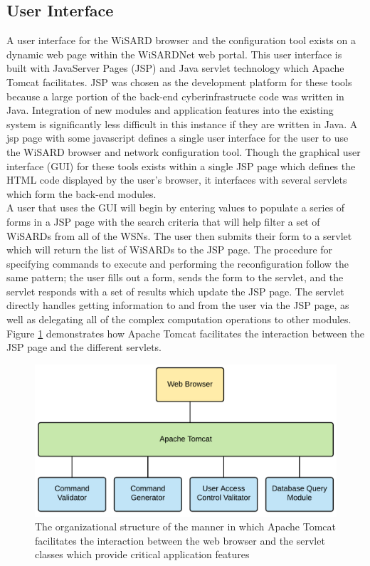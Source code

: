 \subsection{User Interface}
A user interface for the WiSARD browser and the configuration tool exists on a dynamic web page within the WiSARDNet web portal. This user interface is built with JavaServer Pages (JSP) and Java servlet technology which Apache Tomcat facilitates. JSP was chosen as the development platform for these tools because a large portion of the back-end cyberinfrastructe code was written in Java. Integration of new modules and application features into the existing system is significantly less difficult in this instance if they are written in Java. A jsp page with some javascript defines a single user interface for the user to use the WiSARD browser and network configuration tool.  Though the graphical user interface (GUI) for these tools exists within a single JSP page which defines the HTML code displayed by the user's browser, it interfaces with several servlets which form the back-end modules.\\

A user that uses the GUI will begin by entering values to populate a series of forms in a JSP page with the search criteria that will help filter a set of WiSARDs from all of the WSNs. The user then submits their form to a servlet which will return the list  of WiSARDs to the JSP page. The procedure for specifying commands to execute and performing the reconfiguration follow the same pattern; the user fills out a form, sends the form to the servlet, and the servlet responds with a set of results which update the JSP page. The servlet directly handles getting information to and from the user via the JSP page, as well as delegating all of the complex computation operations to other modules. Figure \ref{fig:servlet_architecture} demonstrates how Apache Tomcat facilitates the interaction between the JSP page and the different servlets.

\begin{figure}[H]
	\centering
	\includegraphics[width=\textwidth]{figures/servlet_architecture.png}
	\caption{The organizational structure of the manner in which Apache Tomcat facilitates the interaction between the web browser and the servlet classes which provide critical application features}
	\label{fig:servlet_architecture}
\end{figure}


